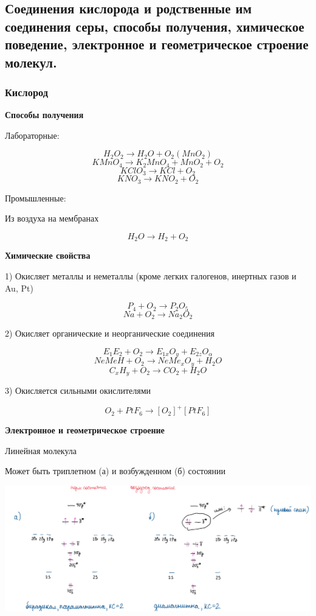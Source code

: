 \documentclass[14pt,a4paper]{scrartcl}
\begin{document}
\subsection{Соединения кислорода и родственные им соединения серы, способы получения, химическое поведение, электронное и геометрическое строение молекул.}

\subsubsection{Кислород}

\textbf{Способы получения}
 
 Лабораторные:
 
$$H_2O_2 \rightarrow H_2O + O_2 (MnO_2)$$
$$KMnO_4 \rightarrow K_2MnO_4 + MnO_2 + O_2$$
$$KClO_3 \rightarrow KCl + O_2$$
$$KNO_3 \rightarrow KNO_2 + O_2$$

Промышленные:

Из воздуха на мембранах

$$H_2O \rightarrow H_2 + O_2$$

\textbf{Химические свойства}

1) Окисляет металлы и неметаллы (кроме легких галогенов, инертных газов и Au, Pt)

$$P_4 + O_2 \rightarrow P_2O_5$$
$$Na + O_2 \rightarrow Na_2O_2$$

2) Окисляет органические и неорганические соединения

$$E_1E_2 + O_2 \rightarrow E_{1x}O_y + E_{2z}O_{\alpha}$$
$$NeMeH + O_2 \rightarrow NeMe_xO_y + H_2O$$
$$C_xH_y + O_2 \rightarrow CO_2 + H_2O$$

3) Окисляется сильными окислителями

$$O_2 + PtF_6 \rightarrow [O_2]^+[PtF_6]$$

\textbf{Электронное и геометрическое строение}

Линейная молекула

Может быть триплетном (а) и возбужденном (б) состоянии

\includegraphics[scale=0.65]{6v1.png}
\end{document}
